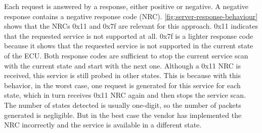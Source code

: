 Each request is answered by a response, either positive or negative. A negative response contains a negative response code (NRC). \autoref{fig:server-response-behaviour} shows that the NRCs 0x11 and 0x7f are relevant for this approach. 0x11 indicates that the requested service is not supported at all. 0x7f is a lighter response code because it shows that the requested service is not supported in the current state of the ECU. Both response codes are sufficient to stop the current service scan with the current state and start with the next one. Although a 0x11 NRC is received, this service is still probed in other states. This is because with this behavior, in the worst case, one request is generated for this service for each state, which in turn receives 0x11 NRC again and then stops the service scan. The number of states detected is usually one-digit, so the number of packets generated is negligible. But in the best case the vendor has implemented the NRC incorrectly and the service is available in a different state.

